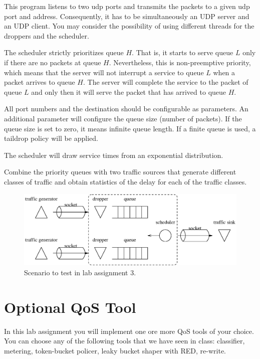 This program listens to two udp ports and transmits the packets to a given udp port and address. Consequently, it has to be simultaneously an UDP server and an UDP client. You may consider the possibility of using different threads for the droppers and the scheduler.

The scheduler strictly prioritizes queue $H$.
That is, it starts to serve queue $L$ only if there are no packets at queue $H$.
Nevertheless, this is non-preemptive priority, which means that the server will not interrupt a service to queue $L$ when a packet arrives to queue $H$.
The server will complete the service to the packet of queue $L$ and only then it will serve the packet that has arrived to queue $H$.

All port numbers and the destination should be configurable as parameters. An additional parameter will configure the queue size (number of packets). If the queue size is set to zero, it means infinite queue length. If a finite queue is used, a taildrop policy will be applied.

The scheduler will draw service times from an exponential distribution.

Combine the priority queues with two traffic sources that generate different classes of traffic and obtain statistics of the delay for each of the traffic classes.

\begin{figure}[!h]
\centering
\includegraphics[width=\linewidth]{figures/scenario3.eps}
\caption{Scenario to test in lab assignment 3.}
\label{fig:scenario3}
\end{figure}

\section{Optional QoS Tool}

In this lab assignment you will implement one ore more QoS tools of your choice.
You can choose any of the following tools that we have seen in class: classifier, metering, token-bucket policer, leaky bucket shaper with RED, re-write.

